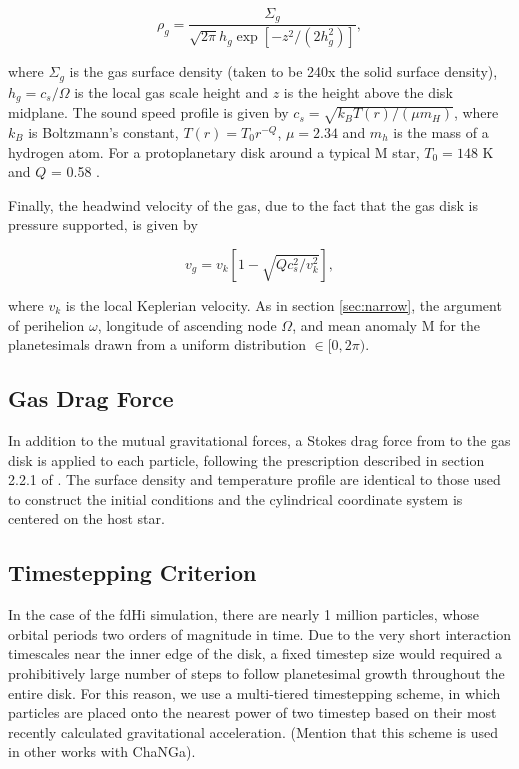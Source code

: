 \documentclass[twocolumn]{aastex63}
\begin{document}
\begin{equation}\label{eq:rho_gas}
	\rho_{g} = \frac{\Sigma_{g}}{\sqrt{2 \pi} h_{g} \exp\left[ -z^{2} / \left( 2 h_{g}^{2} \right) \right]},
\end{equation}

\noindent where $\Sigma_{g}$ is the gas surface density (taken to be 240x the solid surface density), $h_{g} = c_{s} / \Omega$ is the local gas scale height and $z$ is the height above the disk midplane. The sound speed profile is given by $c_{s} = \sqrt{k_{B} T(r) / \left( \mu m_{H} \right)}$, where $k_{B}$ is Boltzmann's constant, $T(r) = T_{0} r^{-Q}$, $\mu = 2.34$ and $m_{h}$ is the mass of a hydrogen atom. For a protoplanetary disk around a typical M star, $T_{0} = 148$ K and $Q$ = 0.58 \citep{andrews05}.

Finally, the headwind velocity of the gas, due to the fact that the gas disk is pressure supported, is given by

\begin{equation}\label{eq:v_gas}
	v_{g} = v_{k} \left[ 1 - \sqrt{ Q c_{s}^2 / v_{k}^2} \right],
\end{equation}

\noindent where $v_{k}$ is the local Keplerian velocity. As in section \ref{sec:narrow}, the argument of perihelion $\omega$, longitude of ascending node $\Omega$, and mean anomaly M for the planetesimals drawn from a uniform distribution $\in [0, 2 \pi)$.

\subsection{Gas Drag Force}

In addition to the mutual gravitational forces, a Stokes drag force from to the gas disk is applied to each particle, following the prescription described in section 2.2.1 of \citet{morishima10}. The surface density and temperature profile are identical to those used to construct the initial conditions and the cylindrical coordinate system is centered on the host star.

\subsection{Timestepping Criterion}

In the case of the fdHi simulation, there are nearly 1 million particles, whose orbital periods two orders of magnitude in time. Due to the very short interaction timescales near the inner edge of the disk, a fixed timestep size would required a prohibitively large number of steps to follow planetesimal growth throughout the entire disk. For this reason, we use a multi-tiered timestepping scheme, in which particles are placed onto the nearest power of two timestep based on their most recently calculated gravitational acceleration. (Mention that this scheme is used in other works with ChaNGa).
\end{document}
